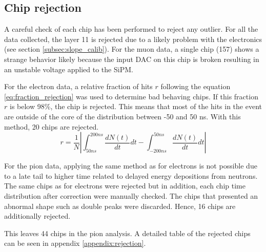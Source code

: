 \subsection{Chip rejection}
\label{sec:ChipRejection}

A careful check of each chip has been performed to reject any outlier. For all the data collected, the layer 11 is rejected due to a likely problem with the electronics (see section \ref{subsec:slope_calib}). For the muon data, a single chip (157) shows a strange behavior likely because the input DAC on this chip is broken resulting in an unstable voltage applied to the SiPM.

For the electron data, a relative fraction of hits $r$ following the equation \ref{eq:fraction_rejection} was used to determine bad behaving chips. If this fraction $r$ is below 98\%, the chip is rejected. This means that most of the hits in the event are outside of the core of the distribution between -50 and 50 ns. With this method, 20 chips are rejected.
\begin{equation} \label{eq:fraction_rejection}
	r = \frac{1}{N} \left|\int_{50 ns}^{200 ns} \frac{dN(t)}{dt} dt - \int_{-200 ns}^{50 ns} \frac{dN(t)}{dt} dt\right|
\end{equation}

For the pion data, applying the same method as for electrons is not possible due to a late tail to higher time related to delayed energy depositions from neutrons. The same chips as for electrons were rejected but in addition, each chip time distribution after correction were manually checked. The chips that presented an abnormal shape such as double peaks were discarded. Hence, 16 chips are additionally rejected.

This leaves 44 chips in the pion analysis. A detailed table of the rejected chips can be seen in appendix \ref{appendix:rejection}.

